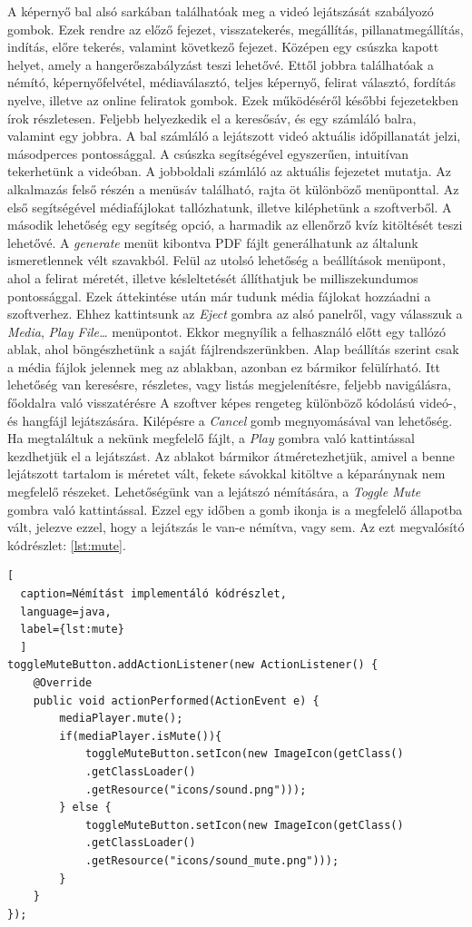 A képernyő bal alsó sarkában találhatóak meg a videó lejátszását szabályozó gombok. Ezek rendre az előző fejezet, visszatekerés, megállítás, pillanatmegállítás, indítás, előre tekerés, valamint következő fejezet. Középen egy csúszka kapott helyet, amely a hangerőszabályzást teszi lehetővé. Ettől jobbra találhatóak a némító, képernyőfelvétel, médiaválasztó, teljes képernyő, felirat választó, fordítás nyelve, illetve az online feliratok gombok. Ezek működéséről későbbi fejezetekben írok részletesen. Feljebb helyezkedik el a keresősáv, és egy számláló balra, valamint egy jobbra. A bal számláló a lejátszott videó aktuális időpillanatát jelzi, másodperces pontossággal. A csúszka segítségével egyszerűen, intuitívan tekerhetünk a videóban. A jobboldali számláló az aktuális fejezetet mutatja. Az alkalmazás felső részén a menüsáv található, rajta öt különböző menüponttal. Az első segítségével médiafájlokat tallózhatunk, illetve kiléphetünk a szoftverből. A második lehetőség egy segítség opció, a harmadik az ellenőrző kvíz kitöltését teszi lehetővé. A \textit{generate} menüt kibontva PDF fájlt generálhatunk az általunk ismeretlennek vélt szavakból. Felül az utolsó lehetőség a beállítások menüpont, ahol a felirat méretét, illetve késleltetését állíthatjuk be milliszekundumos pontossággal. Ezek áttekintése után már tudunk média fájlokat hozzáadni a szoftverhez. Ehhez kattintsunk az \textit{Eject} gombra az alsó panelről, vagy válasszuk a \textit{Media}, \textit{Play File…} menüpontot. Ekkor megnyílik a felhasználó előtt egy tallózó ablak, ahol böngészhetünk a saját fájlrendszerünkben. Alap beállítás szerint csak a média fájlok jelennek meg az ablakban, azonban ez bármikor felülírható. Itt lehetőség van keresésre, részletes, vagy listás megjelenítésre, feljebb navigálásra, főoldalra való visszatérésre A szoftver képes rengeteg különböző kódolású videó-, és hangfájl lejátszására. Kilépésre a \textit{Cancel} gomb megnyomásával van lehetőség. Ha megtaláltuk a nekünk megfelelő fájlt, a \textit{Play} gombra való kattintással kezdhetjük el a lejátszást. Az ablakot bármikor átméretezhetjük, amivel a benne lejátszott tartalom is méretet vált, fekete sávokkal kitöltve a képaránynak nem megfelelő részeket. Lehetőségünk van a lejátszó némítására, a \textit{Toggle Mute} gombra való kattintással. Ezzel egy időben a gomb ikonja is a megfelelő állapotba vált, jelezve ezzel, hogy a lejátszás le van-e némítva, vagy sem. Az ezt megvalósító kódrészlet: \ref{lst:mute}.

\begin{spacing}{1.25}
\begin{lstlisting}[
  caption=Némítást implementáló kódrészlet,
  language=java,
  label={lst:mute}
  ]
toggleMuteButton.addActionListener(new ActionListener() {
    @Override
    public void actionPerformed(ActionEvent e) {
        mediaPlayer.mute();
        if(mediaPlayer.isMute()){
            toggleMuteButton.setIcon(new ImageIcon(getClass()
            .getClassLoader()
            .getResource("icons/sound.png")));
        } else {
            toggleMuteButton.setIcon(new ImageIcon(getClass()
            .getClassLoader()
            .getResource("icons/sound_mute.png")));
        }
    }
});
\end{lstlisting}
\end{spacing}
